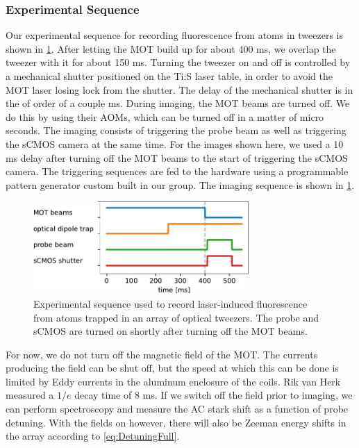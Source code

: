 \subsubsection*{Experimental Sequence}

Our experimental sequence for recording fluorescence from atoms in tweezers is shown in \cref{fig:Sequence}.
After letting the MOT build up for about 400 ms, we overlap the tweezer with it for about 150 ms.
Turning the tweezer on and off is controlled by a mechanical shutter positioned on the \ac{Ti:S} laser table, in order to avoid the MOT laser losing lock from the shutter.
The delay of the mechanical shutter is in the of order of a couple ms. 
During imaging, the MOT beams are turned off.
We do this by using their \ac{AOM}s, which can be turned off in a matter of micro seconds. 
The imaging consists of triggering the probe beam as well as triggering the sCMOS camera at the same time. 
For the images shown here, we used a 10 ms delay after turning off the MOT beams to the start of triggering the sCMOS camera. 
The triggering sequences are fed to the hardware using a programmable pattern generator custom built in our group. 
The imaging sequence is shown in \cref{fig:Sequence}.
\begin{figure}
    \centering
    \includegraphics[width=0.73\textwidth]{figures/Sequence.pdf}
    \caption{Experimental sequence used to record laser-induced fluorescence from atoms trapped in an array of optical tweezers.
    The probe and sCMOS are turned on shortly after turning off the MOT beams. }
    \label{fig:Sequence}
\end{figure}
For now, we do not turn off the magnetic field of the MOT.
The currents producing the field can be shut off, but the speed at which this can be done is limited by Eddy currents in the aluminum enclosure of the coils. 
Rik van Herk measured a $1/e$ decay time of 8 ms.
If we switch off the field prior to imaging, we can perform spectroscopy and measure the AC stark shift as a function of probe detuning. 
With the fields on however, there will also be Zeeman energy shifts in the array according to \cref{eq:DetuningFull}. 

